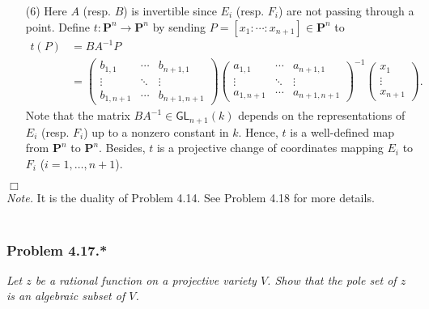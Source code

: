 \documentclass{article}
\begin{document}
\begin{enumerate}
\item[(6)]
  Here $A$ (resp. $B$) is invertible since $E_i$ (resp. $F_i$) are not passing through a point.
  Define $t: \mathbf{P}^{n} \to \mathbf{P}^{n}$ by sending
  $P = [x_1 : \cdots : x_{n+1}] \in \mathbf{P}^{n}$
  to
  \begin{align*}
    t(P)
    &= BA^{-1}P \\
    &=
    \begin{pmatrix}
      b_{1,1}   & \cdots & b_{n+1,1} \\
      \vdots    & \ddots & \vdots \\
      b_{1,n+1} & \cdots & b_{n+1,n+1}
    \end{pmatrix}
    \begin{pmatrix}
      a_{1,1}   & \cdots & a_{n+1,1} \\
      \vdots    & \ddots & \vdots \\
      a_{1,n+1} & \cdots & a_{n+1,n+1}
    \end{pmatrix}^{-1}
    \begin{pmatrix}
      x_1 \\
      \vdots \\
      x_{n+1}
    \end{pmatrix}.
  \end{align*}
  Note that the matrix $BA^{-1} \in \mathsf{GL}_{n+1}(k)$
  depends on the representations of $E_i$ (resp. $F_i$)
  up to a nonzero constant in $k$.
  Hence, $t$ is a well-defined map from $\mathbf{P}^{n}$ to $\mathbf{P}^{n}$.
  Besides, $t$ is a projective change of coordinates mapping $E_i$ to $F_i$
  ($i = 1, \ldots, n+1$).
\end{enumerate}
$\Box$ \\



\emph{Note.}
  It is the duality of Problem 4.14.
  See Problem 4.18 for more details. \\\\






\subsubsection*{Problem 4.17.*}
\emph{Let $z$ be a rational function on a projective variety $V$.
Show that the pole set of $z$ is an algebraic subset of $V$.} \\
\end{document}
